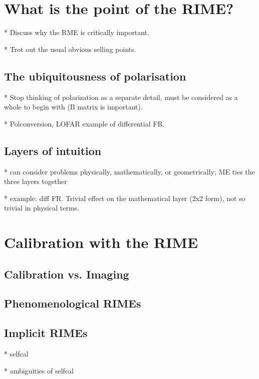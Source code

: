 \documentclass[]{aa}
\begin{document}
\section{\label{sec:what-is-the-point}What is the point of the RIME?}

* Discuss why the RME is critically important. 

* Trot out the usual obvious selling points.

\subsection{The ubiquitousness of polarisation}

* Stop thinking of polarization as a separate detail, must be considered as a whole to begin with (B matrix is important).

* Polconversion, LOFAR example of differential FR.

\subsection{Layers of intuition}

* can consider problems physically, mathematically, or geometrically; ME ties the three layers together

* example: diff FR. Trivial effect on the mathematical layer (2x2 form), not so trivial in physical terms.



\section{\label{sec:calibration}Calibration with the RIME}

\subsection{Calibration vs. Imaging}

\subsection{Phenomenological RIMEs}

\subsection{\label{sec:implicit-mes}Implicit RIMEs}

* selfcal

* ambiguities of selfcal
\end{document}
